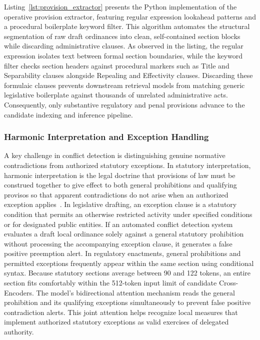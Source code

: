         Listing~\ref{lst:provision_extractor} presents the Python implementation of the operative provision extractor, featuring regular expression lookahead patterns and a procedural boilerplate keyword filter. This algorithm automates the structural segmentation of raw draft ordinances into clean, self-contained section blocks while discarding administrative clauses. As observed in the listing, the regular expression isolates text between formal section boundaries, while the keyword filter checks section headers against procedural markers such as Title and Separability clauses alongside Repealing and Effectivity clauses. Discarding these formulaic clauses prevents downstream retrieval models from matching generic legislative boilerplate against thousands of unrelated administrative acts. Consequently, only substantive regulatory and penal provisions advance to the candidate indexing and inference pipeline.

        \subsubsection{Harmonic Interpretation and Exception Handling}
        \label{sec:exception_handling_sub}
        A key challenge in conflict detection is distinguishing genuine normative contradictions from authorized statutory exceptions. In statutory interpretation, harmonic interpretation is the legal doctrine that provisions of law must be construed together to give effect to both general prohibitions and qualifying provisos so that apparent contradictions do not arise when an authorized exception applies~\cite{agpalo2009statutory}. In legislative drafting, an exception clause is a statutory condition that permits an otherwise restricted activity under specified conditions or for designated public entities. If an automated conflict detection system evaluates a draft local ordinance solely against a general statutory prohibition without processing the accompanying exception clause, it generates a false positive preemption alert. In regulatory enactments, general prohibitions and permitted exceptions frequently appear within the same section using conditional syntax. Because statutory sections average between 90 and 122 tokens, an entire section fits comfortably within the 512-token input limit of candidate Cross-Encoders. The model's bidirectional attention mechanism reads the general prohibition and its qualifying exceptions simultaneously to prevent false positive contradiction alerts. This joint attention helps recognize local measures that implement authorized statutory exceptions as valid exercises of delegated authority.

